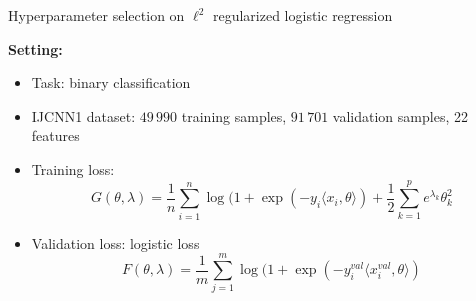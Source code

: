 \documentclass{beamer}
\newcommand{\red}[1]{\textcolor{red}{#1}}
\begin{document}






\begin{frame}{Hyperparameter selection on $\ell^2$ regularized logistic regression}

    \textbf{Setting: }
    \begin{itemize}
        \item Task: binary classification

        \item IJCNN1 dataset: $49\,990$ training samples, $91\,701$ validation samples, 22 features

        \item Training loss:
           $$G(\theta, \lambda) = \frac1n\sum_{i=1}^n \log(1+\exp(-y_i\langle x_i, \theta\rangle) + \frac12\sum_{k=1}^p e^{\lambda_k}\theta_k^2$$

        \item Validation loss: logistic loss
        $$
        F(\theta, \lambda) = \frac1m\sum_{j=1}^m \log(1+\exp(-y_i^{val}\langle x_i^{val}, \theta\rangle)
        $$
    \end{itemize}

\end{frame}
\end{document}
